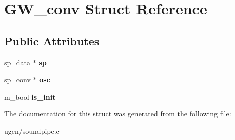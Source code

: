 \hypertarget{structGW__conv}{}\section{G\+W\+\_\+conv Struct Reference}
\label{structGW__conv}
\subsection*{Public Attributes}
\begin{DoxyCompactItemize}
\item 
\hypertarget{structGW__conv_aee02cfc09c6d736f009b05f77896ff2a}{}\label{structGW__conv_aee02cfc09c6d736f009b05f77896ff2a} 
sp\+\_\+data $\ast$ {\bfseries sp}
\item 
\hypertarget{structGW__conv_a676f339513e4d848f78608c0640efdb0}{}\label{structGW__conv_a676f339513e4d848f78608c0640efdb0} 
sp\+\_\+conv $\ast$ {\bfseries osc}
\item 
\hypertarget{structGW__conv_a374e97e8e4189c9b94dd73b5fc1bb781}{}\label{structGW__conv_a374e97e8e4189c9b94dd73b5fc1bb781} 
m\+\_\+bool {\bfseries is\+\_\+init}
\end{DoxyCompactItemize}


The documentation for this struct was generated from the following file\+:\begin{DoxyCompactItemize}
\item 
ugen/soundpipe.\+c\end{DoxyCompactItemize}
